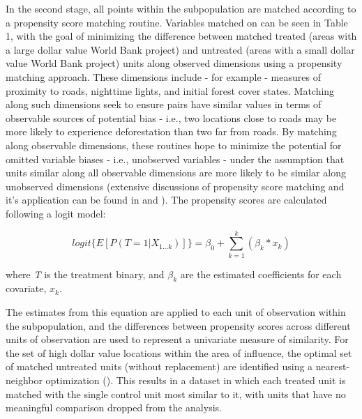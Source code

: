 \documentclass{article}\usepackage[]{graphicx}\usepackage[]{color}
\newenvironment{knitrout}{}{}  %
\begin{document}
\begin{knitrout}
\par
In the second stage, all points within the subpopulation are matched according to a propensity score matching routine.  
Variables matched on can be seen in Table 1, with the goal of minimizing the difference between matched treated (areas with a large dollar value World Bank project) and untreated (areas with a small dollar value World Bank project) units along observed dimensions using a propensity matching approach.
These dimensions include - for example - measures of proximity to roads, nighttime lights, and initial forest cover states.  
Matching along such dimensions seek to ensure pairs have similar values in terms of observable sources of potential bias - i.e., two locations close to roads may be more likely to experience deforestation than two far from roads.
By matching along observable dimensions, these routines hope to minimize the potential for omitted variable biases - i.e., unobserved variables - under the assumption that units similar along all observable dimensions are more likely to be similar along unobserved dimensions (extensive discussions of propensity score matching and it's application can be found in \cite{rubin_estimating_1997} and \cite{abbay_does_2015}).
The propensity scores are calculated following a logit model:

\begin{equation}
logit \Bigg \{ {E} [P(T=1 | X_{1...k})] \Bigg \}= \beta_{0} + \sum_{k=1}^{k}(\beta_{k}*x_{k})
\label{EQpropensity}
\end{equation}

where \textit{T} is the treatment binary, and \begin{math}\beta_{k}\end{math} are the estimated coefficients for each covariate, \begin{math}x_{k}\end{math}.  

The estimates from this equation are applied to each unit of observation within the subpopulation, and the differences between propensity scores across different units of observation are used to represent a univariate measure of similarity.  
For the set of high dollar value locations within the area of influence, the optimal set of matched untreated units (without replacement) are identified using a nearest-neighbor optimization (\cite{ho_matchit:_2011}). 
This results in a dataset in which each treated unit is matched with the single control unit most similar to it, with units that have no meaningful comparison dropped from the analysis.
\par


\end{knitrout}
\end{document}
